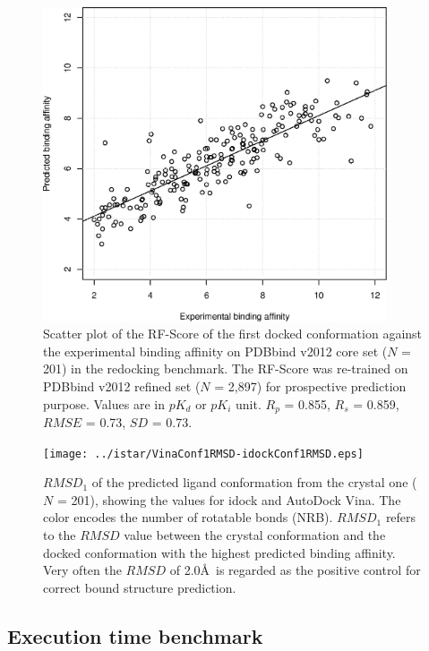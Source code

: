 \begin{figure}
\begin{center}
\includegraphics[width=4in]{../istar/pK-idockConf1RFScore.eps}
\end{center}
\caption{Scatter plot of the RF-Score of the first docked conformation against the experimental binding affinity on PDBbind v2012 core set ($N$ = 201) in the redocking benchmark. The RF-Score was re-trained on PDBbind v2012 refined set ($N$ = 2,897) for prospective prediction purpose. Values are in $pK_d$ or $pK_i$ unit. $R_p$ = 0.855, $R_s$ = 0.859, $RMSE$ = 0.73, $SD$ = 0.73.}
\label{pK-idockConf1RFScore}
\end{figure}

\begin{figure}
\begin{center}
\texttt{[image: ../istar/VinaConf1RMSD-idockConf1RMSD.eps]}
\end{center}
\caption{$RMSD_1$ of the predicted ligand conformation from the crystal one ($N$ = 201), showing the values for idock and AutoDock Vina. The color encodes the number of rotatable bonds (NRB). $RMSD_1$ refers to the $RMSD$ value between the crystal conformation and the docked conformation with the highest predicted binding affinity. Very often the $RMSD$ of 2.0\AA\ is regarded as the positive control for correct bound structure prediction.}
\label{VinaConf1RMSD-idockConf1RMSD}
\end{figure}

\subsection{Execution time benchmark}

